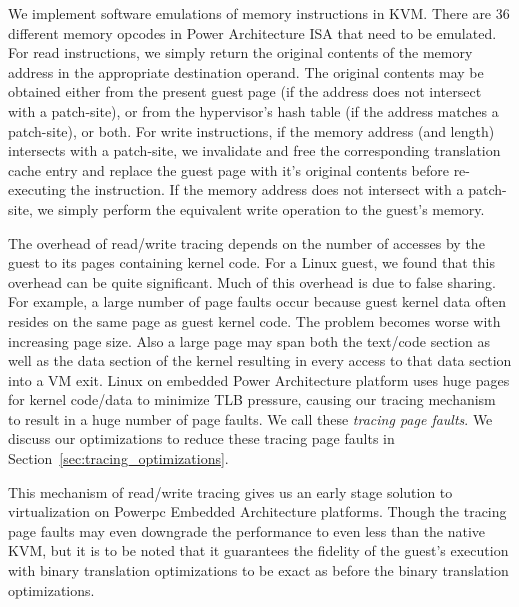 We implement software emulations of memory instructions in KVM. There are 36 different memory opcodes in Power Architecture ISA that need to be emulated. For read instructions, we simply return the original contents of the memory address in the appropriate destination operand. The original contents may be obtained either from the present guest page (if the address does not intersect with a patch-site), or from the hypervisor's hash table (if the address matches a patch-site), or both. For write instructions, if the memory address (and length) intersects with a patch-site, we invalidate and free the corresponding translation cache entry and replace the guest page with it's original contents before re-executing the instruction. If the memory address does not intersect with a patch-site, we simply perform the equivalent write operation to the guest's memory. 

The overhead of read/write tracing depends on the number of accesses by the guest to its pages containing kernel code. For a Linux guest, we found that this overhead can be quite significant. Much of this overhead is due to false sharing. For example, a large number of page faults occur because guest kernel data often resides on the same page as guest kernel code. The problem becomes worse with increasing page size. Also a large page may span both the text/code section as well as the data section of the kernel resulting in every access to that data section into a VM exit. Linux on embedded Power Architecture platform uses huge pages for kernel code/data to minimize TLB pressure, causing our tracing mechanism to result in a huge number of page faults. We call these {\em tracing page faults}. We discuss our optimizations to reduce these tracing page faults in Section~\ref{sec:tracing_optimizations}.

This mechanism of read/write tracing gives us an early stage solution to virtualization on Powerpc Embedded Architecture platforms. Though the tracing page faults may even downgrade the performance to even less than the native KVM, but it is to be noted that it guarantees the fidelity of the guest's execution with binary translation optimizations to be exact as before the binary translation optimizations.



